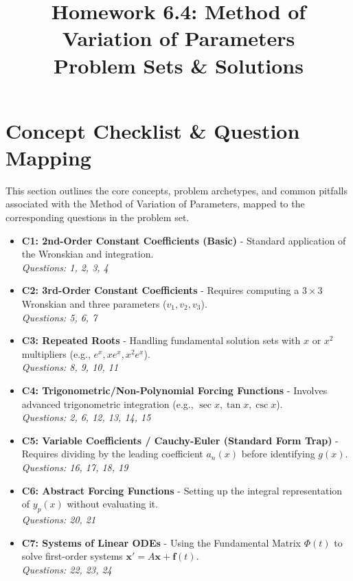 \documentclass[11pt]{article}
\title{Homework 6.4: Method of Variation of Parameters \\ \Large Problem Sets \& Solutions}
\author{}
\date{}
\begin{document}
\maketitle
\tableofcontents
\newpage

\section{Concept Checklist \& Question Mapping}
This section outlines the core concepts, problem archetypes, and common pitfalls associated with the Method of Variation of Parameters, mapped to the corresponding questions in the problem set.

\begin{itemize}
    \item \textbf{C1: 2nd-Order Constant Coefficients (Basic)} - Standard application of the Wronskian and integration. \\
    \textit{Questions: 1, 2, 3, 4}
    
    \item \textbf{C2: 3rd-Order Constant Coefficients} - Requires computing a $3 \times 3$ Wronskian and three parameters ($v_1, v_2, v_3$). \\
    \textit{Questions: 5, 6, 7}
    
    \item \textbf{C3: Repeated Roots} - Handling fundamental solution sets with $x$ or $x^2$ multipliers (e.g., $e^x, xe^x, x^2e^x$). \\
    \textit{Questions: 8, 9, 10, 11}
    
    \item \textbf{C4: Trigonometric/Non-Polynomial Forcing Functions} - Involves advanced trigonometric integration (e.g., $\sec x, \tan x, \csc x$). \\
    \textit{Questions: 2, 6, 12, 13, 14, 15}
    
    \item \textbf{C5: Variable Coefficients / Cauchy-Euler (Standard Form Trap)} - Requires dividing by the leading coefficient $a_n(x)$ before identifying $g(x)$. \\
    \textit{Questions: 16, 17, 18, 19}
    
    \item \textbf{C6: Abstract Forcing Functions} - Setting up the integral representation of $y_p(x)$ without evaluating it. \\
    \textit{Questions: 20, 21}
    
    \item \textbf{C7: Systems of Linear ODEs} - Using the Fundamental Matrix $\Phi(t)$ to solve first-order systems $\mathbf{x}' = A\mathbf{x} + \mathbf{f}(t)$. \\
    \textit{Questions: 22, 23, 24}
    

\end{itemize}
\end{document}

